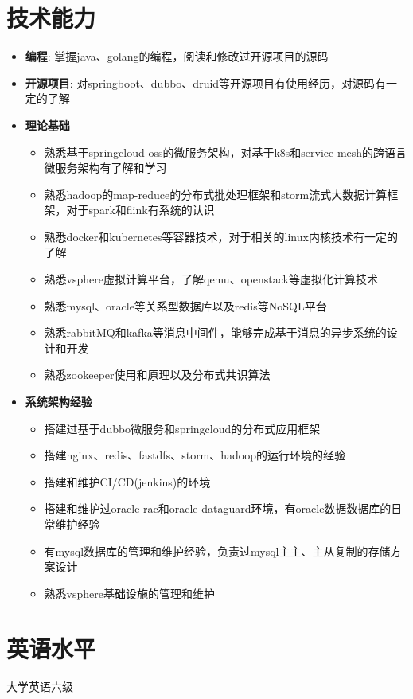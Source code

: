 \documentclass{resume}
\begin{document}
\section{技术能力}
\begin{itemize}[parsep=0.2ex]
  \item \textbf{编程}: 掌握java、golang的编程，阅读和修改过开源项目的源码
  \item \textbf{开源项目}: 对springboot、dubbo、druid等开源项目有使用经历，对源码有一定的了解
  \item \textbf{理论基础}
    \begin{itemize}
      \item 熟悉基于springcloud-oss的微服务架构，对基于k8s和service mesh的跨语言微服务架构有了解和学习
      \item 熟悉hadoop的map-reduce的分布式批处理框架和storm流式大数据计算框架，对于spark和flink有系统的认识
      \item 熟悉docker和kubernetes等容器技术，对于相关的linux内核技术有一定的了解
      \item 熟悉vsphere虚拟计算平台，了解qemu、openstack等虚拟化计算技术
      \item 熟悉mysql、oracle等关系型数据库以及redis等NoSQL平台
      \item 熟悉rabbitMQ和kafka等消息中间件，能够完成基于消息的异步系统的设计和开发
      \item 熟悉zookeeper使用和原理以及分布式共识算法
    \end{itemize}
  \item \textbf{系统架构经验}
    \begin{itemize}
      \item 搭建过基于dubbo微服务和springcloud的分布式应用框架
      \item 搭建nginx、redis、fastdfs、storm、hadoop的运行环境的经验
      \item 搭建和维护CI/CD(jenkins)的环境
      \item 搭建和维护过oracle rac和oracle dataguard环境，有oracle数据数据库的日常维护经验
      \item 有mysql数据库的管理和维护经验，负责过mysql主主、主从复制的存储方案设计
      \item 熟悉vsphere基础设施的管理和维护
    \end{itemize}
\end{itemize}

\section{英语水平}
大学英语六级
\end{document}
